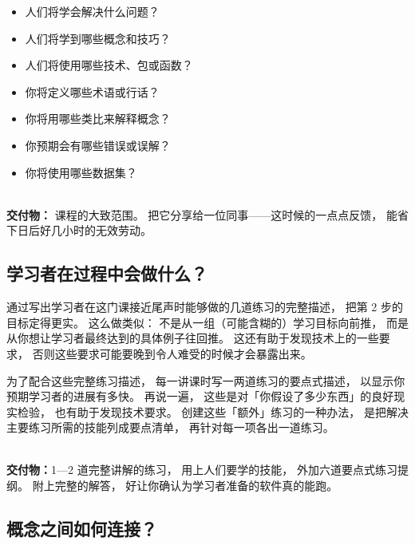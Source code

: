\begin{itemize}

\item
  人们将学会解决什么问题？

\item
  人们将学到哪些概念和技巧？

\item
  人们将使用哪些技术、包或函数？

\item
  你将定义哪些术语或行话？

\item
  你将用哪些类比来解释概念？

\item
  你预期会有哪些错误或误解？

\item
  你将使用哪些数据集？

\end{itemize}

~\\
\noindent
\textbf{交付物：}
课程的大致范围。
把它分享给一位同事——这时候的一点点反馈，
能省下日后好几小时的无效劳动。

\subsection*{学习者在过程中会做什么？}

通过写出学习者在这门课接近尾声时能够做的几道练习的完整描述，
把第 2 步的目标定得更实。
这么做类似：
不是从一组（可能含糊的）学习目标向前推，
而是从你想让学习者最终达到的具体例子往回推。
这还有助于发现技术上的一些要求，
否则这些要求可能要晚到令人难受的时候才会暴露出来。

为了配合这些完整练习描述，
每一讲课时写一两道练习的要点式描述，
以显示你预期学习者的进展有多快。
再说一遍，
这些是对「你假设了多少东西」的良好现实检验，
也有助于发现技术要求。
创建这些「额外」练习的一种办法，
是把解决主要练习所需的技能列成要点清单，
再针对每一项各出一道练习。

~\\
\noindent
\textbf{交付物：}1—2 道完整讲解的练习，
用上人们要学的技能，
外加六道要点式练习提纲。
附上完整的解答，
好让你确认为学习者准备的软件真的能跑。

\subsection*{概念之间如何连接？}

